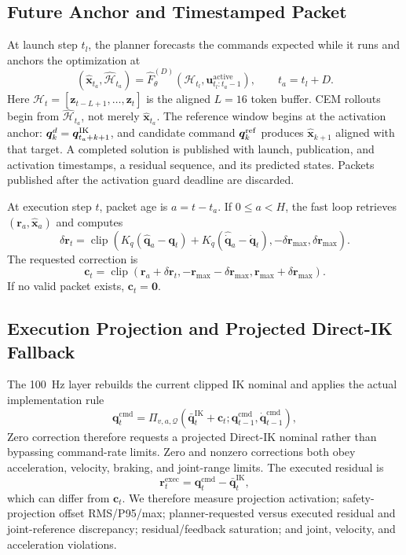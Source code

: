 \documentclass[conference]{IEEEtran}
\begin{document}
\subsection{Future Anchor and Timestamped Packet}
At launch step $t_l$, the planner forecasts the commands expected while it runs and anchors the optimization at
\begin{equation}
 (\hat{\bm x}_{t_a},\hat{\mathcal H}_{t_a})=\hat F_\theta^{(D)}
 (\mathcal H_{t_l},\bm u^{\mathrm{active}}_{t_l:t_a-1}),
 \qquad t_a=t_l+D.
\end{equation}
Here $\mathcal H_t=[\bm z_{t-L+1},\ldots,\bm z_t]$ is the aligned $L=16$ token buffer. CEM rollouts begin from $\hat{\mathcal H}_{t_a}$, not merely $\hat{\bm x}_{t_a}$. The reference window begins at the activation anchor: $\bm q_k^d=\bm q_{t_a+k+1}^{\rm IK}$, and candidate command $\bm q_k^{\rm ref}$ produces $\hat{\bm x}_{k+1}$ aligned with that target. A completed solution is published with launch, publication, and activation timestamps, a residual sequence, and its predicted states. Packets published after the activation guard deadline are discarded.

At execution step $t$, packet age is $a=t-t_a$. If $0\leq a<H$, the fast loop retrieves $(\bm r_a,\hat{\bm x}_a)$ and computes
\begin{equation}
 \delta\bm r_t=\operatorname{clip}
 \left(K_q(\hat{\bm q}_a-\bm q_t)+K_{\dot q}(\hat{\dot{\bm q}}_a-\dot{\bm q}_t),
 -\delta\bm r_{\max},\delta\bm r_{\max}\right).
\end{equation}
The requested correction is
\begin{equation}
 \bm c_t=\operatorname{clip}(\bm r_a+\delta\bm r_t,
 -\bm r_{\max}-\delta\bm r_{\max},
 \bm r_{\max}+\delta\bm r_{\max}).
\end{equation}
If no valid packet exists, $\bm c_t=\bm0$.

\subsection{Execution Projection and Projected Direct-IK Fallback}
The 100~Hz layer rebuilds the current clipped IK nominal and applies the actual implementation rule
\begin{equation}
 \bm q_t^{\mathrm{cmd}}=
 \Pi_{v,a,\mathcal Q}(\bar{\bm q}^{\mathrm{IK}}_t+\bm c_t;
 \bm q_{t-1}^{\mathrm{cmd}},\dot{\bm q}_{t-1}^{\mathrm{cmd}}),
 \label{eq:execution}
\end{equation}
Zero correction therefore requests a projected Direct-IK nominal rather than bypassing command-rate limits. Zero and nonzero corrections both obey acceleration, velocity, braking, and joint-range limits. The executed residual is
\begin{equation}
 \bm r_t^{\mathrm{exec}}=\bm q_t^{\mathrm{cmd}}-\bar{\bm q}^{\mathrm{IK}}_t,
\end{equation}
which can differ from $\bm c_t$. We therefore measure projection activation; safety-projection offset RMS/P95/max; planner-requested versus executed residual and joint-reference discrepancy; residual/feedback saturation; and joint, velocity, and acceleration violations.
\end{document}
